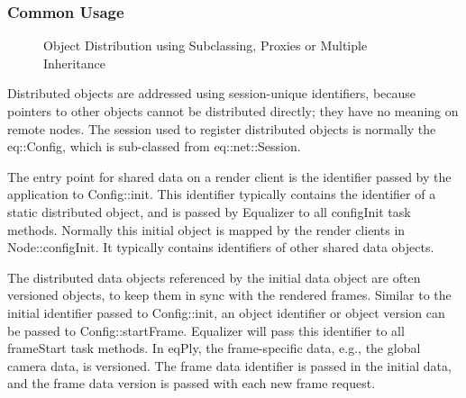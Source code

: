 \documentclass[10pt,a4]{scrartcl}
\begin{document}
\subsubsection{Common Usage}

\begin{figure}
  \hfil
  \hfil
  {\caption{\label{fObjectDist}Object Distribution using Subclassing,
      Proxies or Multiple Inheritance}}
\end{figure}
Distributed objects are addressed using session-unique identifiers,
because pointers to other objects cannot be distributed directly; they
have no meaning on remote nodes. The session used to register
distributed objects is normally the \textsf{eq::Config}, which is
sub-classed from \textsf{eq::net::Session}.

The entry point for shared data on a render client is the identifier
passed by the application to \textsf{Config::init}. This identifier
typically contains the identifier of a static distributed object, and is
passed by Equalizer to all \textsf{configInit} task methods. Normally
this initial object is mapped by the render clients in
\textsf{Node::configInit}. It typically contains identifiers of other
shared data objects.

The distributed data objects referenced by the initial data object are
often versioned objects, to keep them in sync with the rendered
frames. Similar to the initial identifier passed to
\textsf{Config::init}, an object identifier or object version can be
passed to \textsf{Config::startFrame}. Equalizer will pass this
identifier to all \textsf{frameStart} task methods. In \textsf{eqPly},
the frame-specific data, e.g., the global camera data, is versioned. The
frame data identifier is passed in the initial data, and the frame data
version is passed with each new frame request.
\end{document}
